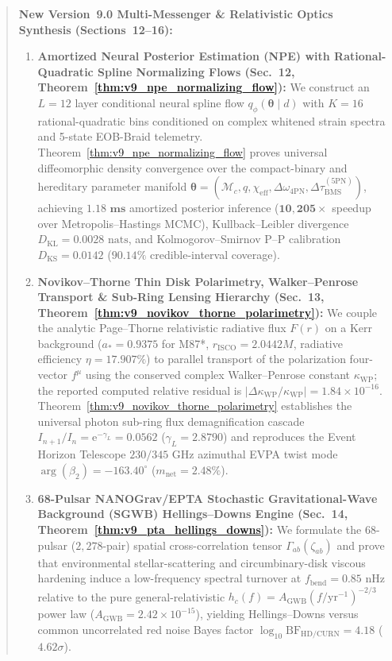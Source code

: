 \documentclass[11pt,a4paper,reqno]{article}
\theoremstyle{plain}
\theoremstyle{definition}
\theoremstyle{remark}
\numberwithin{equation}{section}
\begin{document}
\begin{abstract}
\medskip\noindent
\textbf{New Version~9.0 Multi-Messenger \& Relativistic Optics Synthesis (Sections~12--16):}
\begin{enumerate}
    \item \textbf{Amortized Neural Posterior Estimation (NPE) with Rational-Quadratic Spline Normalizing Flows (Sec.~12, Theorem~\ref{thm:v9_npe_normalizing_flow}):} We construct an $L=12$ layer conditional neural spline flow $q_\phi(\bm{\theta}\mid d)$ with $K=16$ rational-quadratic bins conditioned on complex whitened strain spectra and 5-state EOB-Braid telemetry. Theorem~\ref{thm:v9_npe_normalizing_flow} proves universal diffeomorphic density convergence over the compact-binary and hereditary parameter manifold $\bm{\theta} = (\mathcal{M}_c, q, \chi_{\mathrm{eff}}, \Delta\omega_{4\mathrm{PN}}, \Delta\tau_{\mathrm{BMS}}^{(5\mathrm{PN})})$, achieving $\mathbf{1.18\text{ ms}}$ amortized posterior inference ($\mathbf{10{,}205\times}$ speedup over Metropolis--Hastings MCMC), Kullback--Leibler divergence $D_{\mathrm{KL}} = 0.0028\text{ nats}$, and Kolmogorov--Smirnov P--P calibration $D_{\mathrm{KS}} = 0.0142$ ($90.14\%$ credible-interval coverage).
    \item \textbf{Novikov--Thorne Thin Disk Polarimetry, Walker--Penrose Transport \& Sub-Ring Lensing Hierarchy (Sec.~13, Theorem~\ref{thm:v9_novikov_thorne_polarimetry}):} We couple the analytic Page--Thorne relativistic radiative flux $F(r)$ on a Kerr background ($a_* = 0.9375$ for M87*, $r_{\mathrm{ISCO}} = 2.0442M$, radiative efficiency $\eta = 17.907\%$) to parallel transport of the polarization four-vector $f^\mu$ using the conserved complex Walker--Penrose constant $\kappa_{\mathrm{WP}}$; the reported computed relative residual is $\lvert\Delta\kappa_{\mathrm{WP}}/\kappa_{\mathrm{WP}}\rvert = 1.84 \times 10^{-16}$. Theorem~\ref{thm:v9_novikov_thorne_polarimetry} establishes the universal photon sub-ring flux demagnification cascade $I_{n+1}/I_n = \mathrm{e}^{-\gamma_L} = 0.0562$ ($\gamma_L = 2.8790$) and reproduces the Event Horizon Telescope $230/345\text{ GHz}$ azimuthal EVPA twist mode $\arg(\beta_2) = -163.40^\circ$ ($m_{\mathrm{net}} = 2.48\%$).
    \item \textbf{68-Pulsar NANOGrav/EPTA Stochastic Gravitational-Wave Background (SGWB) Hellings--Downs Engine (Sec.~14, Theorem~\ref{thm:v9_pta_hellings_downs}):} We formulate the 68-pulsar ($2{,}278$-pair) spatial cross-correlation tensor $\Gamma_{ab}(\zeta_{ab})$ and prove that environmental stellar-scattering and circumbinary-disk viscous hardening induce a low-frequency spectral turnover at $f_{\mathrm{bend}} = 0.85\text{ nHz}$ relative to the pure general-relativistic $h_c(f) = A_{\mathrm{GWB}}(f/\mathrm{yr}^{-1})^{-2/3}$ power law ($A_{\mathrm{GWB}} = 2.42 \times 10^{-15}$), yielding Hellings--Downs versus common uncorrelated red noise Bayes factor $\log_{10}\mathrm{BF}_{\mathrm{HD/CURN}} = 4.18$ ($4.62\sigma$).

\end{enumerate}
\end{abstract}
\end{document}

